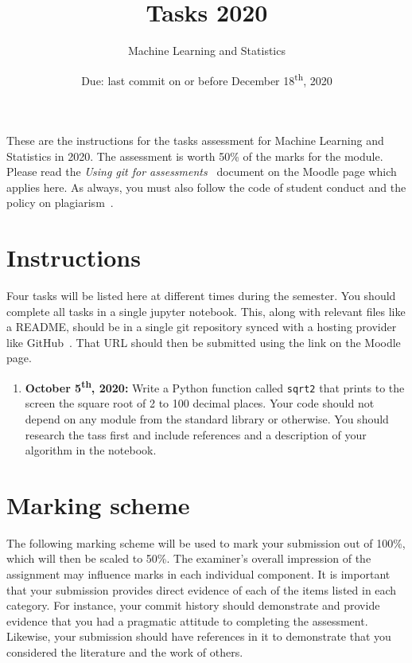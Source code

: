 \documentclass[a4paper, 12pt]{scrartcl}
\title{\vspace{-20mm}Tasks 2020}
\author{Machine Learning and Statistics}
\date{Due: last commit on or before December 18\textsuperscript{th}, 2020\vspace{-6mm}}
\begin{document}
  
  
  \maketitle

  These are the instructions for the tasks assessment for Machine Learning and Statistics in 2020.
  The assessment is worth 50\% of the marks for the module.
  Please read the \emph{Using git for assessments}~\cite{usinggit} document on the Moodle page which applies here.
  As always, you must also follow the code of student conduct and the policy on plagiarism~\cite{gmitqaf}.

  \section*{Instructions}
  Four tasks will be listed here at different times during the semester.
  You should complete all tasks in a single jupyter notebook.
  This, along with relevant files like a README, should be in a single git repository synced with a hosting provider like GitHub~\cite{github}.
  That URL should then be submitted using the link on the Moodle page.

  \begin{enumerate}
    \item
      \textbf{October 5\textsuperscript{th}, 2020:}
      Write a Python function called \texttt{sqrt2} that prints to the screen the square root of 2 to 100 decimal places.
      Your code should not depend on any module from the standard library or otherwise.
      You should research the tass first and include references and a description of your algorithm in the notebook.
  \end{enumerate}


\newpage

\section*{Marking scheme}
  The following marking scheme will be used to mark your submission out of 100\%, which will then be scaled to 50\%.
  The examiner's overall impression of the assignment may influence marks in each individual component.
  It is important that your submission provides direct evidence of each of the items listed in each category.
  For instance, your commit history should demonstrate and provide evidence that you had a pragmatic attitude to completing the assessment.
  Likewise, your submission should have references in it to demonstrate that you considered the literature and the work of others.
\end{document}

